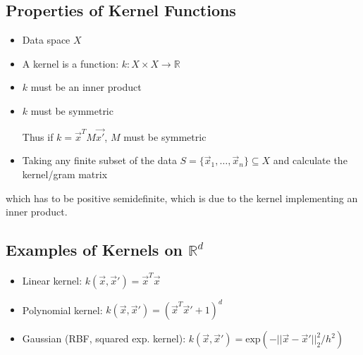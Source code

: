 \documentclass[10pt,a4paper]{scrartcl}
\begin{document}
\begin{multicols*}{2}

\subsection{Properties of Kernel Functions}

\begin{itemize}
\item Data space $X$
\item A kernel is a function: $k:X\times X\rightarrow \mathbb{R}$
\item $k$ must be an inner product
\item $k$ must be symmetric

Thus if $k=\vec{x}^TM\vec{x'}$, $M$ must be symmetric
\item Taking any finite subset of the data $S=\{\vec{x}_1,\ldots,\vec{x}_n\}\subseteq X$ and calculate the kernel/gram matrix

\end{itemize}

which has to be positive semidefinite, which is due to the kernel implementing an inner product.


\subsection{Examples of Kernels on $\mathbb{R}^d$}

\begin{itemize}
\item Linear kernel: $k(\vec{x},\vec{x}') = \vec{x}^T\vec{x}$
\item Polynomial kernel: $k(\vec{x},\vec{x}') = (\vec{x}^T\vec{x}'+1)^d$
\item Gaussian (RBF, squared exp. kernel): $k(\vec{x},\vec{x}')=\text{exp}(-||\vec{x}-\vec{x}'||_2^2/h^2)$


\end{itemize}
\end{multicols*}
\end{document}
